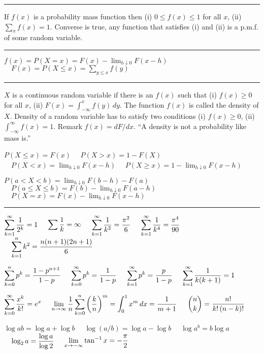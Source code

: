 \smallskip
\hrule

\smallskip
If $f(x)$ is a probability mass function then
(i) $0\le f(x)\le 1$ for all $x$,
(ii) $\sum_xf(x)=1$.
Converse is true, any function that satisfies (i) and (ii) is a
p.m.f. of some random variable.

\smallskip
\hrule

\smallskip
$f(x)=P(X=x)=F(x)-\lim_{h\downarrow0}F(x-h)$
$\quad F(x)=P(X\le x)=\sum_{y\le x}f(y)$

\smallskip
\hrule

\smallskip
$X$ is a continuous random variable if there is an $f(x)$ such that
(i) $f(x)\ge0$ for all $x$,
(ii) $\displaystyle F(x)=\int_{-\infty}^x f(y)\,dy$.
The function $f(x)$ is called the density of $X$.
Density of a random variable has to satisfy two conditions
(i) $f(x)\ge 0$,
(ii) $\displaystyle\int_{-\infty}^\infty f(x)=1$.
Remark $f(x)=dF/dx$.
``A density is not a probability like mass is.''

\vfill
\eject

$P(X\le x)=F(x)$
$\quad P(X>x)=1-F(X)$
$\quad \displaystyle P(X<x)=\lim_{h\downarrow0}F(x-h)$
$\quad\displaystyle P(X\ge x)=1-\lim_{h\downarrow0}F(x-h)$

\smallskip
$\displaystyle P(a<X<b)=\lim_{h\downarrow0}F(b-h)-F(a)$
$\quad\displaystyle P(a\le X\le b)=F(b)-\lim_{h\downarrow0}F(a-h)$
$\quad\displaystyle P(X=x)=F(x)-\lim_{h\downarrow0}F(x-h)$

\smallskip
\hrule

\smallskip
$\displaystyle\sum_{k=1}^\infty{1\over2^k}=1$
$\quad\displaystyle\sum{1\over k}=\infty$
$\quad\displaystyle\sum_{k=1}^\infty{1\over k^2}={\pi^2\over6}$
$\quad\displaystyle\sum_{k=1}^\infty{1\over k^4}={\pi^4\over90}$
$\quad\displaystyle\sum_{k=1}^nk^2={n(n+1)(2n+1)\over6}$

\smallskip
$\displaystyle\sum_{k=0}^np^k={1-p^{n+1}\over1-p}$
$\quad\displaystyle\sum_{k=0}^\infty p^k={1\over1-p}$
$\quad\displaystyle\sum_{k=1}^\infty p^k={p\over1-p}$
$\quad\displaystyle\sum_{k=1}^\infty{1\over k(k+1)}=1$

\smallskip
$\displaystyle\sum_{k=0}^\infty{x^k\over k!}=e^x$
$\quad\displaystyle\lim_{n\to\infty}{1\over n}
\sum_{k=0}^n\left({k\over n}\right)^m
=\int_0^1x^m\,dx={1\over m+1}$
$\quad\displaystyle{n\choose k}={n!\over k!\,(n-k)!}$

\smallskip
$\log ab=\log a+\log b$
$\quad\log(a/b)=\log a-\log b$
$\quad\log a^b=b\log a$
$\quad\displaystyle\log_2 a={\log a\over\log 2}$
$\quad\displaystyle\lim_{x\to-\infty}\tan^{-1}x=-{\pi\over2}$

